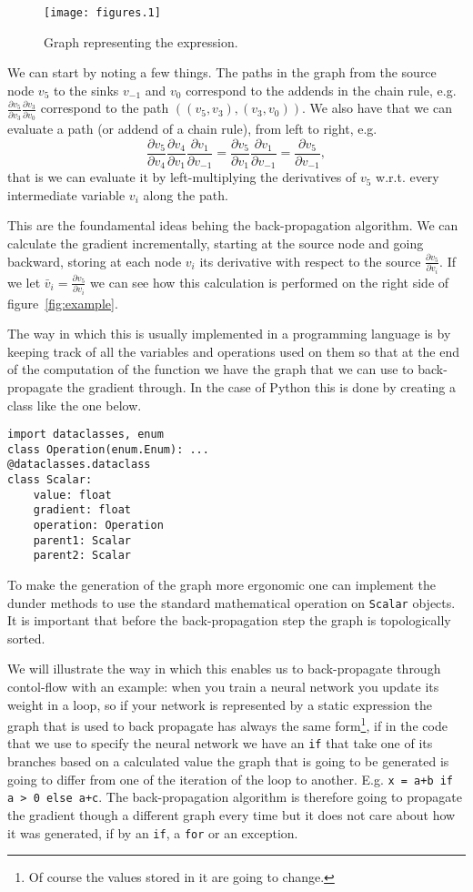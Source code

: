 \documentclass{article}
\newcommand{\partialfrac}[2]{\frac{\partial #1}{\partial #2}}
\begin{document}
\begin{figure}
\centering
\texttt{[image: figures.1]}
\label{fig:dag}
\caption{Graph representing the expression.}
\end{figure}

We can start by noting a few things. The paths in the graph from the source
node \(v_5\)
to the sinks \(v_{-1}\) and \(v_0\) correspond to the addends in the chain
rule, e.g.
\(\partialfrac{v_5}{v_3}\partialfrac{v_3}{v_0}\) correspond to the path
\(((v_5,v_3), (v_3,v_0)).\) We also have that we can evaluate a path (or addend
of a chain rule), from left to right, e.g. \[
\partialfrac{v_5}{v_4}\partialfrac{v_4}{v_1}\partialfrac{v_1}{v_{-1}}
= \partialfrac{v_5}{v_1}\partialfrac{v_1}{v_{-1}}
= \partialfrac{v_5}{v_{-1}},\]
that is we can evaluate it by left-multiplying the derivatives of \(v_5\)
w.r.t. every intermediate variable \(v_i\) along the path.

This are the foundamental ideas behing the back-propagation algorithm. We
can calculate the gradient incrementally, starting at the source node and going
backward, storing at each node \(v_i\) its derivative with respect to the
source \(\partialfrac{v_5}{v_i}.\)
If we let \(\bar v_i = \partialfrac{v_5}{v_i}\) we can see how this calculation
is performed on the right side of figure~\ref{fig:example}.

The way in which this is usually implemented in a programming language is by
keeping track of all the variables and operations used on them so that at the
end of the computation of the function we have the graph that we can use to
back-propagate the gradient through. In the case of Python this is done by
creating a class like the one below.

\begin{verbatim}
import dataclasses, enum
class Operation(enum.Enum): ...
@dataclasses.dataclass
class Scalar:
    value: float
    gradient: float
    operation: Operation
    parent1: Scalar
    parent2: Scalar
\end{verbatim}

To make the generation of the graph more ergonomic one can implement the dunder
methods to use the standard mathematical operation on \texttt{Scalar} objects.
It is important that before the back-propagation step the graph is
topologically sorted.

We will illustrate the way in which this
enables us to back-propagate through contol-flow with an example: when you train
a neural network you update its weight in a loop, so if your network is
represented by a static expression the graph that is used to back propagate has
always the same form\footnote{Of course the values stored in it are going to
change.}, if in the code that we use to specify the neural network we have an
\texttt{if} that take one of its branches based on a calculated value the graph
that is going to be generated is going to differ from one of the iteration of
the loop to another. E.g. \texttt{x = a+b if a > 0 else a+c}.
The back-propagation algorithm is therefore going to
propagate the gradient though a different graph every time but it does not care
about how it was generated, if by an \texttt{if}, a \texttt{for} or an
exception.
\end{document}
